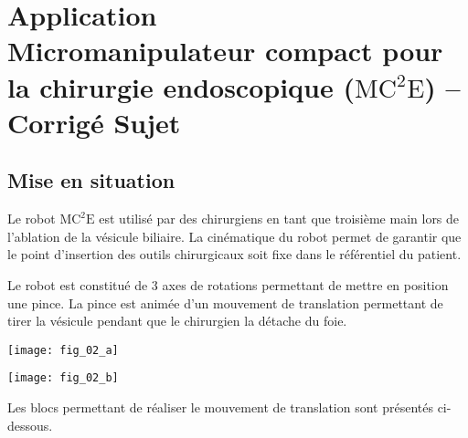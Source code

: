 \chapter*{Application  \\ 
Micromanipulateur compact pour la chirurgie endoscopique ($\text{MC}^2\text{E}$) -- \ifprof Corrigé \else Sujet \fi}

\iflivret {} \else
\ifprof  {} \else \fi
\fi

\setcounter{question}{0}


\section*{Mise en situation}

\ifprof
\else
Le robot $\text{MC}^2\text{E}$ est utilisé par des chirurgiens en tant que troisième main lors de l'ablation de la vésicule biliaire. La cinématique du robot permet de garantir que le point d'insertion des outils chirurgicaux soit fixe dans le référentiel du patient. 

Le robot est constitué de 3 axes de rotations permettant de mettre en position une pince. La pince est animée d'un mouvement de translation permettant de tirer la vésicule pendant que le chirurgien la détache du foie. 

\begin{marginfigure}
\texttt{[image: fig\_02\_a]}
\end{marginfigure}

\begin{marginfigure}
\texttt{[image: fig\_02\_b]}
\end{marginfigure}


Les blocs permettant de réaliser le mouvement de translation sont présentés ci-dessous.


